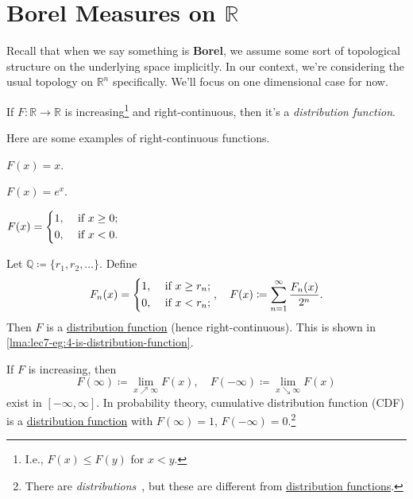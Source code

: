 \section{Borel Measures on \(\mathbb{R}\)}
\begin{prev}
	Recall that when we say something is \textbf{Borel}, we assume some sort of topological structure on the underlying space implicitly. In our context, we're considering the usual topology on \(\mathbb{R}^n \) specifically. We'll focus on one dimensional case for now.
\end{prev}

\begin{definition}\label{def:distribution-function}
	If \(F\colon \mathbb{R} \to \mathbb{R}\) is increasing\footnote{I.e., \(F(x)\leq F(y)\) for \(x<y\).} and right-continuous, then it's a \emph{distribution function}.
\end{definition}

Here are some examples of right-continuous functions.

\begin{eg}
	\(F(x) = x\).
\end{eg}

\begin{eg}
	\(F(x) = e^x\).
\end{eg}

\begin{eg}
	\(F(x) = \begin{dcases}
		1, & \text{ if } x\geq 0; \\
		0, & \text{ if } x < 0.
	\end{dcases}\)
\end{eg}

\begin{eg}\label{eg:lec7-4}
	Let \(\mathbb{Q} \coloneqq \{r_1, r_2, \dots  \}\). Define
	\[
		F_n(x) = \begin{dcases}
			1, & \text{ if } x\geq r_n; \\
			0, & \text{ if } x < r_n;
		\end{dcases},\quad
		F(x) \coloneqq \sum_{n=1}^{\infty} \frac{F_n(x)}{2^n}.
	\]
	Then \(F\) is a \hyperref[def:distribution-function]{distribution function} (hence right-continuous). This is shown in \autoref{lma:lec7-eg:4-is-distribution-function}.
\end{eg}

\begin{note}
	If \(F\) is increasing, then
	\[
		F(\infty )\coloneqq \lim_{x \nearrow \infty} F(x),\quad F(-\infty ) \coloneqq \lim_{x \searrow \infty} F(x)
	\]
	exist in \([-\infty , \infty ]\). In probability theory, cumulative distribution function (CDF) is a \hyperref[def:distribution-function]{distribution function} with \(F(\infty ) = 1\), \(F(-\infty ) = 0\).\footnote{There are \emph{distributions}~\cite[]{folland1999real}, but these are different from \hyperref[def:distribution-function]{distribution functions}.}
\end{note}

